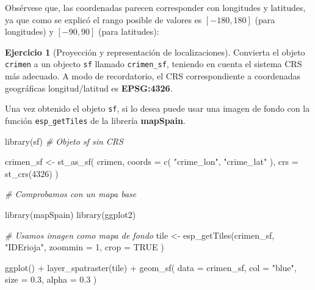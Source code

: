 \documentclass[
]{book}
\newenvironment{Shaded}{\begin{snugshade}}{\end{snugshade}}
\newcommand{\AttributeTok}[1]{\textcolor[rgb]{0.77,0.63,0.00}{#1}}
\newcommand{\CommentTok}[1]{\textcolor[rgb]{0.56,0.35,0.01}{\textit{#1}}}
\newcommand{\ConstantTok}[1]{\textcolor[rgb]{0.00,0.00,0.00}{#1}}
\newcommand{\DecValTok}[1]{\textcolor[rgb]{0.00,0.00,0.81}{#1}}
\newcommand{\FloatTok}[1]{\textcolor[rgb]{0.00,0.00,0.81}{#1}}
\newcommand{\FunctionTok}[1]{\textcolor[rgb]{0.00,0.00,0.00}{#1}}
\newcommand{\NormalTok}[1]{#1}
\newcommand{\OtherTok}[1]{\textcolor[rgb]{0.56,0.35,0.01}{#1}}
\newcommand{\SpecialCharTok}[1]{\textcolor[rgb]{0.00,0.00,0.00}{#1}}
\newcommand{\StringTok}[1]{\textcolor[rgb]{0.31,0.60,0.02}{#1}}
\theoremstyle{definition}
\theoremstyle{definition}
\theoremstyle{definition}
\newtheorem{exercise}{Ejercicio}[chapter]
\theoremstyle{definition}
\theoremstyle{remark}
\begin{document}
Obsérvese que, las coordenadas parecen corresponder con longitudes y latitudes,
ya que como se explicó el rango posible de valores es \([-180, 180]\) (para
longitudes) y \([-90, 90]\) (para latitudes):

\begin{exercise}[Proyección y representación de localizaciones]
\protect\hypertarget{exr:ex28}{}\label{exr:ex28}Convierta el objeto \texttt{crimen} a un objecto \texttt{sf} llamado \texttt{crimen\_sf}, teniendo en
cuenta el sistema CRS más adecuado. A modo de recordatorio, el CRS
correspondiente a coordenadas geográficas longitud/latitud es \textbf{EPSG:4326}.

Una vez obtenido el objeto \texttt{sf}, si lo desea puede usar una imagen de fondo con
la función \texttt{esp\_getTiles} de la librería \textbf{mapSpain}.
\end{exercise}

\begin{Shaded}
\begin{Highlighting}[]

\FunctionTok{library}\NormalTok{(sf)}
\CommentTok{\# Objeto sf sin CRS}

\NormalTok{crimen\_sf }\OtherTok{\textless{}{-}} \FunctionTok{st\_as\_sf}\NormalTok{(}
\NormalTok{  crimen,}
  \AttributeTok{coords =} \FunctionTok{c}\NormalTok{(}
    \StringTok{"crime\_lon"}\NormalTok{,}
    \StringTok{"crime\_lat"}
\NormalTok{  ),}
  \AttributeTok{crs =} \FunctionTok{st\_crs}\NormalTok{(}\DecValTok{4326}\NormalTok{)}
\NormalTok{)}

\CommentTok{\# Comprobamos con un mapa base}

\FunctionTok{library}\NormalTok{(mapSpain)}
\FunctionTok{library}\NormalTok{(ggplot2)}

\CommentTok{\# Usamos imagen como mapa de fondo}
\NormalTok{tile }\OtherTok{\textless{}{-}} \FunctionTok{esp\_getTiles}\NormalTok{(crimen\_sf, }\StringTok{"IDErioja"}\NormalTok{,}
  \AttributeTok{zoommin =} \DecValTok{1}\NormalTok{,}
  \AttributeTok{crop =} \ConstantTok{TRUE}
\NormalTok{)}

\FunctionTok{ggplot}\NormalTok{() }\SpecialCharTok{+}
  \FunctionTok{layer\_spatraster}\NormalTok{(tile) }\SpecialCharTok{+}
  \FunctionTok{geom\_sf}\NormalTok{(}
    \AttributeTok{data =}\NormalTok{ crimen\_sf,}
    \AttributeTok{col =} \StringTok{"blue"}\NormalTok{,}
    \AttributeTok{size =} \FloatTok{0.3}\NormalTok{,}
    \AttributeTok{alpha =} \FloatTok{0.3}
\NormalTok{  )}
\end{Highlighting}
\end{Shaded}
\end{document}
